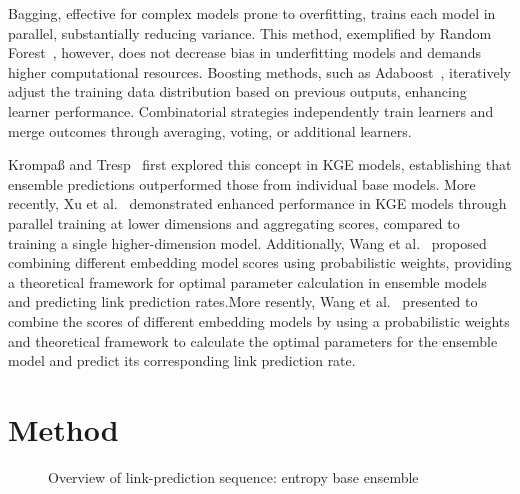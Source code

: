 \documentclass{article}
\begin{document}
Bagging, effective for complex models prone to overfitting, trains each model in parallel, substantially reducing variance. This method, exemplified by Random Forest~\cite{breiman2001random}, however, does not decrease bias in underfitting models and demands higher computational resources. Boosting methods, such as  Adaboost~\cite{freund1996experiments}, iteratively adjust the training data distribution based on previous outputs, enhancing learner performance. Combinatorial strategies independently train learners and merge outcomes through averaging, voting, or additional learners.

Krompaß and Tresp~\cite{krompass2015ensemble} first explored this concept in KGE models, establishing that ensemble predictions outperformed those from individual base models. More recently, Xu et al.~\cite{9533372} demonstrated enhanced performance in KGE models through parallel training at lower dimensions and aggregating scores, compared to training a single higher-dimension model. Additionally, Wang et al.~\cite{WANG20221041} proposed combining different embedding model scores using probabilistic weights, providing a theoretical framework for optimal parameter calculation in ensemble models and predicting link prediction rates.More resently, Wang et al.~\cite{WANG20221041} presented to combine the scores of different embedding models by using a probabilistic weights and theoretical framework to calculate the optimal parameters for the ensemble model and predict its corresponding link prediction rate.

\section{Method}

\bgroup
\begin{figure}[t]
  \centering \makeatletter{}
  \makeatother
  \caption{{Overview of link-prediction sequence: entropy base ensemble}}
  \label{fig:sysArch}
  \hfill
\end{figure}
\egroup
\end{document}
